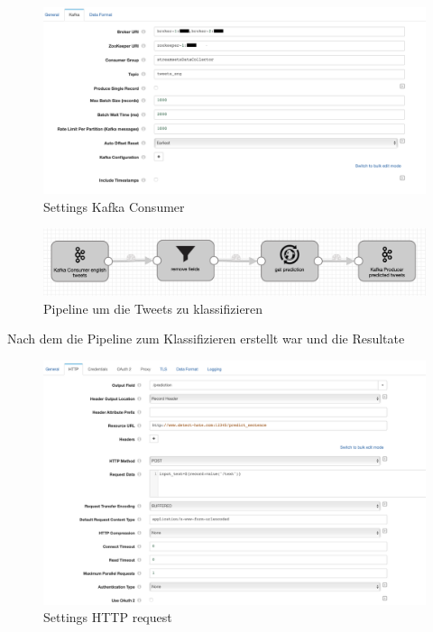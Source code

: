\begin{figure}[H]
	\centering
		\includegraphics[scale=0.4 ]{images/setting_to_mongo_kafka.png}
	\caption{Settings Kafka Consumer}
	\label{fig:high_level_architecure}
\end{figure}

\begin{figure}[H]
	\centering
		\includegraphics[scale=0.4 ]{images/predict_tweets.png}
	\caption{Pipeline um die Tweets zu klassifizieren}
	\label{fig:high_level_architecure}
\end{figure}

Nach dem die Pipeline zum Klassifizieren erstellt war und die Resultate 

\begin{figure}[H]
	\centering
		\includegraphics[scale=0.4 ]{images/settings_http.png}
	\caption{Settings HTTP request}
	\label{fig:high_level_architecure}
\end{figure}


